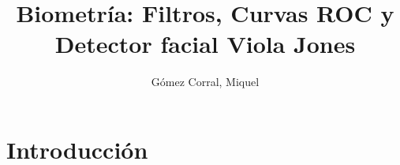 \documentclass[11pt,spanish,listoffigures,listoftables]{tfgetsinf}
\title{Biometría: Filtros, Curvas ROC y Detector facial Viola Jones}
\author{Gómez Corral, Miquel}
\begin{document}
 









\mainmatter

\chapter{Introducción}

\end{document}
